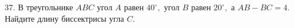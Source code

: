 37. В треугольнике $ABC$ угол $A$ равен $40^\circ,$ угол $B$ равен $20^\circ,$ а $AB-BC=4.$  Найдите длину биссектрисы угла $C.$\\
